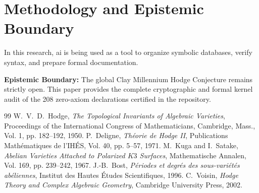 \documentclass[11pt,a4paper]{article}
\theoremstyle{definition}
\begin{document}
\section{Methodology and Epistemic Boundary}

In this research, ai is being used as a tool to organize symbolic databases, verify syntax, and prepare formal documentation.

\textbf{Epistemic Boundary:} The global Clay Millennium Hodge Conjecture remains strictly open. This paper provides the complete cryptographic and formal kernel audit of the 208 zero-axiom declarations certified in the repository.


\begin{thebibliography}{99}
 W.~V.~D.~Hodge, \emph{The Topological Invariants of Algebraic Varieties}, Proceedings of the International Congress of Mathematicians, Cambridge, Mass., Vol. 1, pp. 182--192, 1950.
 P.~Deligne, \emph{Th\'eorie de Hodge II}, Publications Math\'ematiques de l'IH\'ES, Vol. 40, pp. 5--57, 1971.
 M.~Kuga and I.~Satake, \emph{Abelian Varieties Attached to Polarized $K3$ Surfaces}, Mathematische Annalen, Vol. 169, pp. 239--242, 1967.
 J.-B.~Bost, \emph{P\'eriodes et degr\'es des sous-vari\'et\'es ab\'eliennes}, Institut des Hautes \'Etudes Scientifiques, 1996.
 C.~Voisin, \emph{Hodge Theory and Complex Algebraic Geometry}, Cambridge University Press, 2002.
\end{thebibliography}
\end{document}
